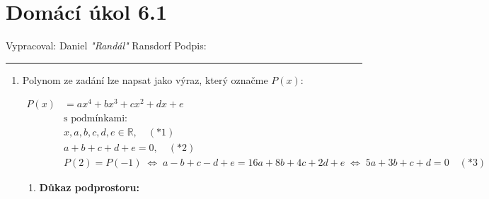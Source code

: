 \documentclass[12pt]{article}
\begin{document}
\section*{Domácí úkol 6.1}

Vypracoval: Daniel \textit{"Randál"} Ransdorf \hfill Podpis: \rule{4cm}{0.4pt}

\begin{enumerate}
  \item
  Polynom ze zadání lze napsat jako výraz, který označme $P(x)$:

  \begin{align*}
    P(x) &= ax^4+bx^3+cx^2+dx+e \\
    &\text{s podmínkami:} \\
    &x,a,b,c,d,e \in \mathbb{R}, \quad(*1)\\
    &a+b+c+d+e = 0, \quad(*2)\\
    &P(2) = P(-1) \;\Leftrightarrow\; a-b+c-d+e = 16a+8b+4c+2d+e \;\Leftrightarrow\; 5a+3b+c+d=0 \quad(*3)
  \end{align*}

  \begin{enumerate}
    \item \textbf{Důkaz podprostoru:}
    

\end{enumerate}
\end{enumerate}
\end{document}
